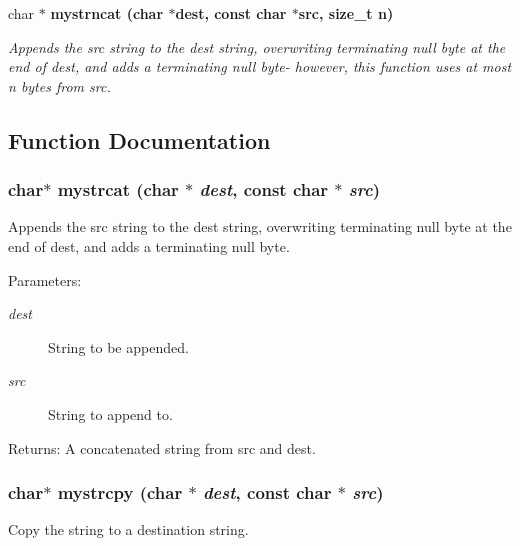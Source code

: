 \begin{CompactItemize}
char $\ast$ \bf{mystrncat} (char $\ast$dest, const char $\ast$src, size\_\-t n)
\begin{CompactList}\small\item\em Appends the src string to the dest string, overwriting terminating null byte at the end of dest, and adds a terminating null byte- however, this function uses at most n bytes from src. \item\end{CompactList}\end{CompactItemize}


\subsection{Function Documentation}
\subsubsection{\setlength{\rightskip}{0pt plus 5cm}char$\ast$ mystrcat (char $\ast$ {\em dest}, const char $\ast$ {\em src})}\label{mystring_8c_ebc286ca79fc1f0b7ca5d05066cd79a7}


Appends the src string to the dest string, overwriting terminating null byte at the end of dest, and adds a terminating null byte. 

\begin{Desc}
\item[Parameters:]
\begin{description}
\item[{\em dest}]String to be appended. \item[{\em src}]String to append to.\end{description}
\end{Desc}
\begin{Desc}
\item[Returns:]A concatenated string from src and dest. \end{Desc}
\subsubsection{\setlength{\rightskip}{0pt plus 5cm}char$\ast$ mystrcpy (char $\ast$ {\em dest}, const char $\ast$ {\em src})}\label{mystring_8c_515b2c58f31e99a4564e463ffbf73e2f}


Copy the string to a destination string. 

